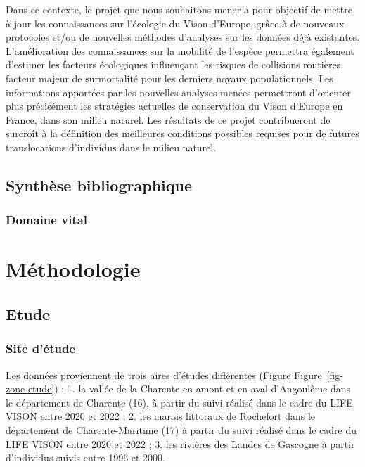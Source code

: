 \documentclass[
  letterpaper,
  DIV=11,
  numbers=noendperiod]{scrreprt}
\begin{document}
Dans ce contexte, le projet que nous souhaitons mener a pour objectif de
mettre à jour les connaissances sur l'écologie du Vison d'Europe, grâce
à de nouveaux protocoles et/ou de nouvelles méthodes d'analyses sur les
données déjà existantes. L'amélioration des connaissances sur la
mobilité de l'espèce permettra également d'estimer les facteurs
écologiques influençant les risques de collisions routières, facteur
majeur de surmortalité pour les derniers noyaux populationnels. Les
informations apportées par les nouvelles analyses menées permettront
d'orienter plus précisément les stratégies actuelles de conservation du
Vison d'Europe en France, dans son milieu naturel. Les résultats de ce
projet contribueront de surcroît à la définition des meilleures
conditions possibles requises pour de futures translocations d'individus
dans le milieu naturel.

\chapter{Synthèse bibliographique}\label{synthuxe8se-bibliographique}

\section{Domaine vital}\label{domaine-vital}

\part{Méthodologie}

\chapter{Etude}\label{etude}

\section{Site d'étude}\label{site-duxe9tude}

Les données proviennent de trois aires d'études différentes (Figure
Figure~\ref{fig-zone-etude}) : 1. la vallée de la Charente en amont et
en aval d'Angoulême dans le département de Charente (16), à partir du
suivi réalisé dans le cadre du LIFE VISON entre 2020 et 2022 ; 2. les
marais littoraux de Rochefort dans le département de Charente-Maritime
(17) à partir du suivi réalisé dans le cadre du LIFE VISON entre 2020 et
2022 ; 3. les rivières des Landes de Gascogne à partir d'individus
suivis entre 1996 et 2000.
\end{document}
